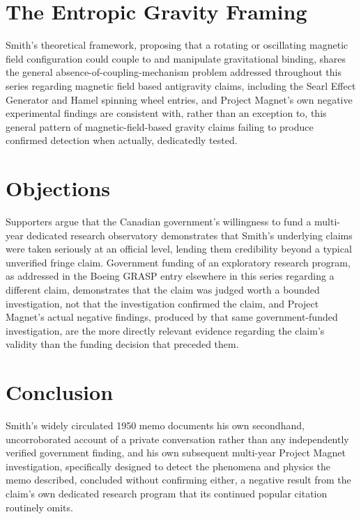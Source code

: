\documentclass[11pt]{article}
\begin{document}
\section{The Entropic Gravity Framing}

Smith's theoretical framework, proposing that a rotating or oscillating magnetic field configuration could couple to and manipulate gravitational binding, shares the general absence-of-coupling-mechanism problem addressed throughout this series regarding magnetic field based antigravity claims, including the Searl Effect Generator and Hamel spinning wheel entries, and Project Magnet's own negative experimental findings are consistent with, rather than an exception to, this general pattern of magnetic-field-based gravity claims failing to produce confirmed detection when actually, dedicatedly tested.

\section{Objections}

Supporters argue that the Canadian government's willingness to fund a multi-year dedicated research observatory demonstrates that Smith's underlying claims were taken seriously at an official level, lending them credibility beyond a typical unverified fringe claim. Government funding of an exploratory research program, as addressed in the Boeing GRASP entry elsewhere in this series regarding a different claim, demonstrates that the claim was judged worth a bounded investigation, not that the investigation confirmed the claim, and Project Magnet's actual negative findings, produced by that same government-funded investigation, are the more directly relevant evidence regarding the claim's validity than the funding decision that preceded them.

\section{Conclusion}

Smith's widely circulated 1950 memo documents his own secondhand, uncorroborated account of a private conversation rather than any independently verified government finding, and his own subsequent multi-year Project Magnet investigation, specifically designed to detect the phenomena and physics the memo described, concluded without confirming either, a negative result from the claim's own dedicated research program that its continued popular citation routinely omits.
\end{document}
